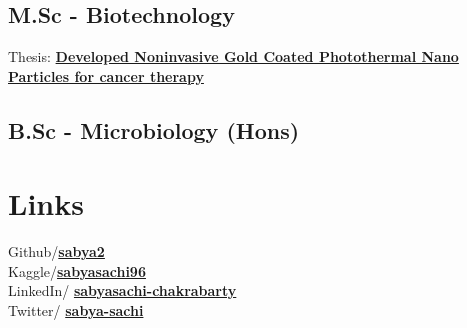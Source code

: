\documentclass[letterpaper]{deedy-resume} %
\begin{document}
\begin{minipage}[t]{0.33\textwidth}
\sectionspace %
\subsection{M.Sc - Biotechnology}
Thesis: \href{https://www.thieme-connect.com/products/ejournals/abstract/10.1055/s-0042-1755497}{\bf Developed Noninvasive Gold Coated Photothermal Nano Particles for cancer therapy}

\sectionspace %
\subsection{B.Sc - Microbiology (Hons)}





\section{Links} 

\faGithub \hspace{2pt} Github/\href{https://github.com/Sabya2}{\bf sabya2} \\
\faKaggle \hspace{2pt} Kaggle/\href{https://www.kaggle.com/sabyasachi96}{\bf sabyasachi96}\\
\faLinkedin \hspace{2pt} LinkedIn/ \href{https://www.linkedin.com/in/sabyasachi-chakrabarty/}{\bf sabyasachi-chakrabarty} \\
\faTwitterSquare \hspace{2pt} Twitter/ \href{https://twitter.com/sabya_sachi0}{\bf sabya-sachi} \\



\end{minipage} %
\hfill
%
%
\end{document}
